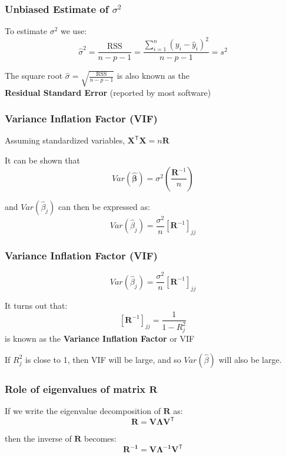 \documentclass[12pt]{beamer}\usepackage[]{graphicx}\usepackage[]{color}
\begin{document}

\begin{frame}
\frametitle{Unbiased Estimate of $\sigma^2$}

To estimate $\sigma^2$ we use:
$$
\hat{\sigma}^2 = \frac{\text{RSS}}{n-p-1} = \frac{\sum_{i=1}^{n} (y_i - \hat{y}_i)^2}{n-p-1} = s^2
$$

The square root $\hat{\sigma} = \sqrt{\frac{\text{RSS}}{n-p-1}}$ is also known as the \\
\textbf{Residual Standard Error} {\lolit (reported by most software)}

\end{frame}


\begin{frame}
\frametitle{Variance Inflation Factor (VIF)}

Assuming standardized variables, $\mathbf{X^\mathsf{T} X} = n \mathbf{R}$

It can be shown that 
$$
Var(\boldsymbol{\hat{\beta}}) = \sigma^2 \left ( \frac{\mathbf{R}^{-1}}{n} \right )
$$

and $Var(\hat{\beta}_j)$ can then be expressed as:
$$
Var(\hat{\beta}_j) = \frac{\sigma^2}{n} [\mathbf{R}^{-1}]_{jj}
$$

\end{frame}


\begin{frame}
\frametitle{Variance Inflation Factor (VIF)}

$$
Var(\hat{\beta}_j) = \frac{\sigma^2}{n} [\mathbf{R}^{-1}]_{jj}
$$

It turns out that:
$$
[\mathbf{R}^{-1}]_{jj} = \frac{1}{1 - R_{j}^{2}}
$$
is known as the \textbf{Variance Inflation Factor} or VIF

\bigskip
If $R_{j}^{2}$ is close to 1, then VIF will be large, and so $Var(\hat{\beta})$ will also be large.

\end{frame}


\begin{frame}
\frametitle{Role of eigenvalues of matrix $\mathbf{R}$}

If we write the eigenvalue decomposition of $\mathbf{R}$ as:
{\large
$$
\mathbf{R = V \boldsymbol{\Lambda} V^\mathsf{T}}
$$
}

\pause
then the inverse of $\mathbf{R}$ becomes:
{\large
$$
\mathbf{R^{-1} = V \boldsymbol{\Lambda}^{-1} V^\mathsf{T}}
$$
}

\end{frame}
\end{document}
